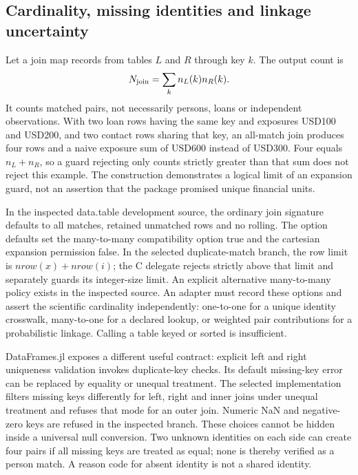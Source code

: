\subsection{Cardinality, missing identities and linkage uncertainty}

Let a join map records from tables $L$ and $R$ through key $k$. The output count is
\[
 N_{\rm join}=\sum_k n_L(k)n_R(k).
\]
It counts matched pairs, not necessarily persons, loans or independent observations. With two loan rows having the same key and exposures USD100 and USD200, and two contact rows sharing that key, an all-match join produces four rows and a naive exposure sum of USD600 instead of USD300. Four equals $n_L+n_R$, so a guard rejecting only counts strictly greater than that sum does not reject this example. The construction demonstrates a logical limit of an expansion guard, not an assertion that the package promised unique financial units.~\citep{exec25_dww_choice}

In the inspected data.table development source, the ordinary join signature defaults to all matches, retained unmatched rows and no rolling. The option defaults set the many-to-many compatibility option true and the cartesian expansion permission false. In the selected duplicate-match branch, the row limit is $nrow(x)+nrow(i)$; the C delegate rejects strictly above that limit and separately guards its integer-size limit. An explicit alternative many-to-many policy exists in the inspected source. An adapter must record these options and assert the scientific cardinality independently: one-to-one for a unique identity crosswalk, many-to-one for a declared lookup, or weighted pair contributions for a probabilistic linkage. Calling a table keyed or sorted is insufficient.~\citep{exec25_dww_datatable}

DataFrames.jl exposes a different useful contract: explicit left and right uniqueness validation invokes duplicate-key checks. Its default missing-key error can be replaced by equality or unequal treatment. The selected implementation filters missing keys differently for left, right and inner joins under unequal treatment and refuses that mode for an outer join. Numeric NaN and negative-zero keys are refused in the inspected branch. These choices cannot be hidden inside a universal null conversion. Two unknown identities on each side can create four pairs if all missing keys are treated as equal; none is thereby verified as a person match. A reason code for absent identity is not a shared identity.~\citep{exec25_dww_dataframes,exec25_dww_choice}

